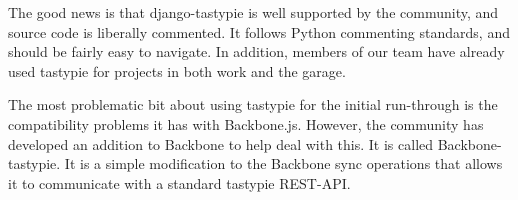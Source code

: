 The good news is that django-tastypie is well supported by the community, and source code is liberally commented.
It follows Python commenting standards, and should be fairly easy to navigate.
In addition, members of our team have already used tastypie for projects in both work and the garage.


The most problematic bit about using tastypie for the initial run-through is the compatibility problems it has with Backbone.js.
However, the community has developed an addition to Backbone to help deal with this.
It is called Backbone-tastypie.
It is a simple modification to the Backbone sync operations that allows it to communicate with a standard tastypie REST-API.
